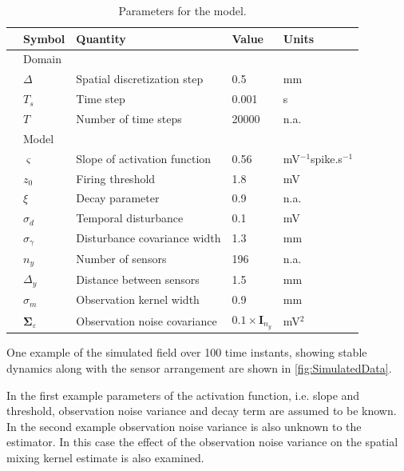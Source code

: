 \documentclass[10pt,twocolumn,twoside]{IEEEtran}
\begin{document}
\begin {table}[t]
\begin{center}
	{\tiny\begin{tabular}{lllll}
	\hline \hline
	& Symbol & Quantity &Value& Units\\ 
	\hline 
	& Domain&&& \\
	& $\Delta$ &Spatial discretization step&0.5&mm \\ 
 	& $T_s$ &Time step&0.001&s \\ 
 	& $T$ &Number of time steps&20000&n.a.
\\ 
 	&Model&&& \\
 	& $\varsigma$ &Slope of activation function&0.56 \cite{Wendling2005}&mV$^{-1}$spike.s$^{-1}$ \\ 
 	& $z_{0}$ &Firing threshold &1.8 \cite{Marreiros2008}&mV \\ 
 	& $\xi$ &Decay parameter&0.9 \cite{Freestone2011} &n.a.
\\  
  & $\sigma_{d}$ &Temporal disturbance&0.1 &mV \\  
  & $\sigma_{\gamma}$ &Disturbance covariance width&1.3 &mm \\  
  & $n_{y}$ &Number of sensors&196 &n.a.
\\  
  & $\Delta_{y}$ &Distance between sensors&1.5 &mm \\  
  & $\sigma_{m}$ &Observation kernel width&0.9 &mm \\  
  & $\boldsymbol\Sigma_{\varepsilon}$ &Observation noise covariance&$0.1\times\mathbf{I}_{n_y}$ &mV$^2$ \\    
 	\hline \hline
	\end{tabular}}
 \caption {Parameters for the model.
} 
 \label{table:SimulationParameters}
 \end{center}
 \end {table}
 One example of the simulated field over 100 time instants, showing stable dynamics along with the sensor arrangement are shown in \figurename{\ref{fig:SimulatedData}}.

In the first example parameters of the activation function, i.e.
slope and threshold, observation noise variance and decay term are assumed to be known.
In the second example observation noise variance is also unknown to the estimator.
In this case the effect of the observation noise variance on the spatial mixing kernel estimate is also examined.
\end{document}
